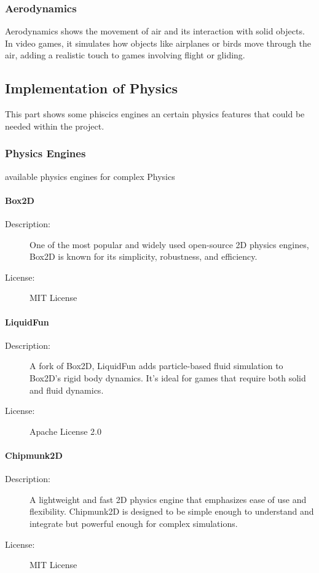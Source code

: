 \documentclass{projdoc}
\begin{document}
\subsubsection{Aerodynamics}
Aerodynamics shows the movement of air and its interaction with solid objects. In video games, it simulates how objects like airplanes or birds move through the air, adding a realistic touch to games involving flight or gliding.

\subsection{Implementation of Physics}

This part shows some phiscics engines an certain physics features that could be needed within the project.


\subsubsection{Physics Engines}
available physics engines for complex Physics
\paragraph{Box2D}
\begin{description}
	\item[Description:] One of the most popular and widely used open-source 2D physics engines, Box2D is known for its simplicity, robustness, and efficiency.
	\item[License:] MIT License
\end{description}

\paragraph{LiquidFun}
\begin{description}
	\item[Description:] A fork of Box2D, LiquidFun adds particle-based fluid simulation to Box2D's rigid body dynamics. It’s ideal for games that require both solid and fluid dynamics.
	\item[License:] Apache License 2.0
\end{description}

\paragraph{Chipmunk2D}
\begin{description}
	\item[Description:] A lightweight and fast 2D physics engine that emphasizes ease of use and flexibility. Chipmunk2D is designed to be simple enough to understand and integrate but powerful enough for complex simulations.
	\item[License:] MIT License
\end{description}
\end{document}
